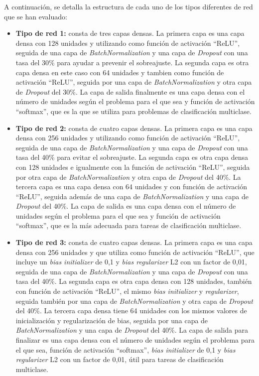 A continuación, se detalla la estructura de cada uno de los tipos diferentes de red que se han evaluado:
\begin{itemize}
    \item \textbf{Tipo de red 1:} consta de tres capas densas. La primera capa es una capa densa con 128 unidades y utilizando como función de activación ``ReLU'', seguida de una capa de \textit{BatchNormalization} y una capa de \textit{Dropout} con una tasa del 30\% para ayudar a prevenir el sobreajuste. La segunda capa es otra capa densa en este caso con 64 unidades y tambien como función de activación ``ReLU'', seguida por una capa de \textit{BatchNormalization} y otra capa de \textit{Dropout} del 30\%. La capa de salida finalmente es una capa densa con el número de unidades según el problema para el que sea y función de activación ``softmax'', que es la que se utiliza para problemas de clasificación multiclase.
    \item \textbf{Tipo de red 2:} consta de cuatro capas densas. La primera capa es una capa densa con 256 unidades y utilizando como función de activación ``ReLU'', seguida de una capa de \textit{BatchNormalization} y una capa de \textit{Dropout} con una tasa del 40\% para evitar el sobreajuste. La segunda capa es otra capa densa con 128 unidades e igualmente con la función de activación ``ReLU'', seguida por otra capa de \textit{BatchNormalization} y otra capa de \textit{Dropout} del 40\%. La tercera capa es una capa densa con 64 unidades y con función de activación ``ReLU'', seguida además de una capa de \textit{BatchNormalization} y una capa de \textit{Dropout} del 40\%. La capa de salida es una capa densa con el número de unidades según el problema para el que sea y función de activación ``softmax'', que es la más adecuada para tareas de clasificación multiclase.
    \item \textbf{Tipo de red 3:} consta de cuatro capas densas. La primera capa es una capa densa con 256 unidades y que utiliza como función de activación ``ReLU'', que incluye un \textit{bias initializer} de 0,1 y \textit{bias regularizer} L2 con un factor de 0,01, seguida de una capa de \textit{BatchNormalization} y una capa de \textit{Dropout} con una tasa del 40\%. La segunda capa es otra capa densa con 128 unidades, también con función de activación ``ReLU'', el mismo \textit{bias initializer} y \textit{regularizer}, seguida también por una capa de \textit{BatchNormalization} y otra capa de \textit{Dropout} del 40\%. La tercera capa densa tiene 64 unidades con los mismos valores de inicialización y regularización de bias, seguida por una capa de \textit{BatchNormalization} y una capa de \textit{Dropout} del 40\%. La capa de salida para finalizar es una capa densa con el número de unidades según el problema para el que sea, función de activación ``softmax'', \textit{bias initializer} de 0,1 y \textit{bias regularizer} L2 con un factor de 0,01, útil para tareas de clasificación multiclase.

\end{itemize}
